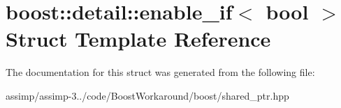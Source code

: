 \hypertarget{structboost_1_1detail_1_1enable__if}{\section{boost\+:\+:detail\+:\+:enable\+\_\+if$<$ bool $>$ Struct Template Reference}
\label{structboost_1_1detail_1_1enable__if}
}


The documentation for this struct was generated from the following file\+:\begin{DoxyCompactItemize}
\item 
assimp/assimp-\/3../code/\+Boost\+Workaround/boost/shared\+\_\+ptr.\+hpp\end{DoxyCompactItemize}
